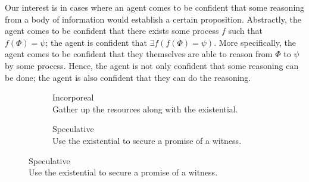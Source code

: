 \documentclass[10pt]{article}
\newcommand{\future}[1]{\ensuremath{\mathcal{#1}}}
\begin{document}
Our interest is in cases where an agent comes to be confident that some reasoning from a body of information would establish a certain proposition.
Abstractly, the agent comes to be confident that there exists some process \(f\) such that \(f(\Phi) = \psi\); the agent is confident that \(\exists f(f(\Phi) = \psi)\).
More specifically, the agent comes to be confident that they themselves are able to reason from \(\Phi\) to \(\psi\) by some process.
Hence, the agent is not only confident that some reasoning can be done; the agent is also confident that they can do the reasoning.

\begin{figure}[h]
  \begin{subfigure}{.5\textwidth}
    \centering
    \caption{Incorporeal \\ Gather up the resources along with the existential.}
    \label{fig:non-constructive}
  \end{subfigure}
  \begin{subfigure}{.5\textwidth}
    \centering
    \caption{Speculative \\ Use the existential to secure a promise of a witness.}
    \label{fig:speculative}
  \end{subfigure}
\end{figure}
\end{document}
